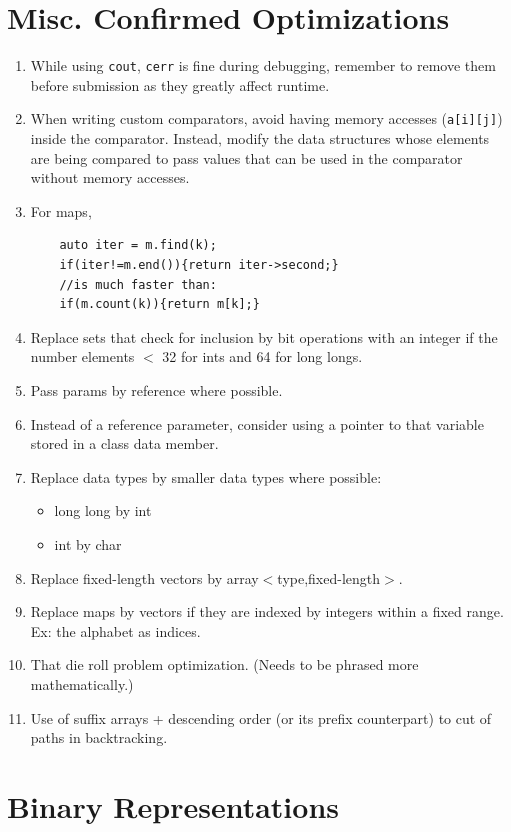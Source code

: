 \documentclass{report}
\begin{document}
\section{Misc. Confirmed Optimizations}
\begin{enumerate}
    \item While using \texttt{cout}, \texttt{cerr} is fine during debugging, remember to remove them before submission as they greatly affect runtime.
    \item When writing custom comparators, avoid having memory accesses (\texttt{a[i][j]}) inside the comparator. Instead, modify the data structures whose elements are being compared to pass values that can be used in the comparator without memory accesses.
    \item For maps,
\begin{lstlisting}
    auto iter = m.find(k);
    if(iter!=m.end()){return iter->second;}
    //is much faster than:
    if(m.count(k)){return m[k];}
\end{lstlisting}
    \item Replace sets that check for inclusion by bit operations with an integer if the number elements $<$ 32 for ints and 64 for long longs. 
    \item Pass params by reference where possible.
    \item Instead of a reference parameter, consider using a pointer to that variable stored in a class data member.
    \item Replace data types by smaller data types where possible:
        \begin{itemize}
            \item long long by int
            \item int by char
        \end{itemize} 
    \item Replace fixed-length vectors by array$<$type,fixed-length$>$.
    \item Replace maps by vectors if they are indexed by integers within a fixed range. Ex: the alphabet as indices.
    \item That die roll problem optimization. (Needs to be phrased more mathematically.)
    \item Use of suffix arrays + descending order (or its prefix counterpart) to cut of paths in backtracking.
\end{enumerate}
\section{Binary Representations}
\end{document}
